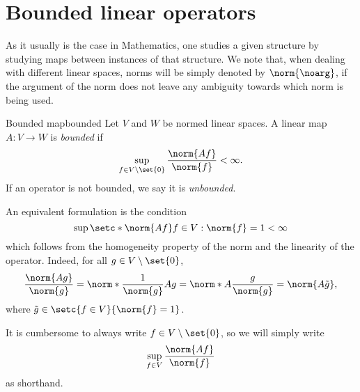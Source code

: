\section{Bounded linear operators}
As it usually is the case in Mathematics, one studies a given structure by studying maps between instances of that structure. We note that, when dealing with different linear spaces, norms will be simply denoted by \(\norm{\noarg}\), if the argument of the norm does not leave any ambiguity towards which norm is being used.

\begin{definition}{Bounded map}{bounded}
    Let \(V\) and \(W\) be normed linear spaces. A linear map \(A : V \to W\) is \emph{bounded} if
    \begin{equation*}
        \sup_{f\in V\setminus\set{0}} \frac{\norm{A f}}{\norm{f}} < \infty.
    \end{equation*}
    If an operator is not bounded, we say it is \emph{unbounded}.
\end{definition}
\begin{remark}
    An equivalent formulation is the condition
    \begin{equation*}
        \sup{\setc*{\norm{Af}}{f \in V : \norm{f} = 1}} < \infty
    \end{equation*}
    which follows from the homogeneity property of the norm and the linearity of the operator. Indeed, for all \(g \in V\setminus\set{0}\),
    \begin{equation*}
        \frac{\norm{Ag}}{\norm{g}} = \norm*{\frac{1}{\norm{g}}Ag} = \norm*{A\frac{g}{\norm{g}}} = \norm{A\tilde{g}},
    \end{equation*}
    where \(\tilde{g} \in \setc{f \in V}{\norm{f} = 1}\).
\end{remark}
\begin{remark}
    It is cumbersome to always write \(f \in V \setminus\set{0}\), so we will simply write
    \begin{equation*}
        \sup_{f \in V} \frac{\norm{Af}}{\norm{f}}
    \end{equation*}
    as shorthand.
\end{remark}


